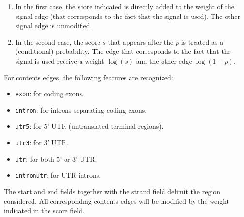 \begin{enumerate}
\item In the first case, the score indicated is directly added to the
  weight of the signal edge (that corresponds to the fact that the
  signal is used). The other signal edge is unmodified.
\item In the second case, the score $s$ that appears after the $p$ is
  treated as a (conditional) probability. The edge that corresponds to
  the fact that the signal is used receive a weight $\log(s)$ and the
  other edge $\log(1-p)$.
\end{enumerate}

For contents edges, the following features are recognized:
\begin{itemize}
\item \texttt{exon}: for coding exons.
\item \texttt{intron}: for introns separating coding exons.
\item \texttt{utr5}: for 5' UTR (untranslated terminal regions).
\item \texttt{utr3}: for 3' UTR.
\item \texttt{utr}: for both 5' or 3' UTR.
\item \texttt{intronutr}: for UTR introns.
\end{itemize}
The start and end fields together with the strand field delimit the
region considered. All corresponding contents edges will be modified
by the weight indicated in the score field.


